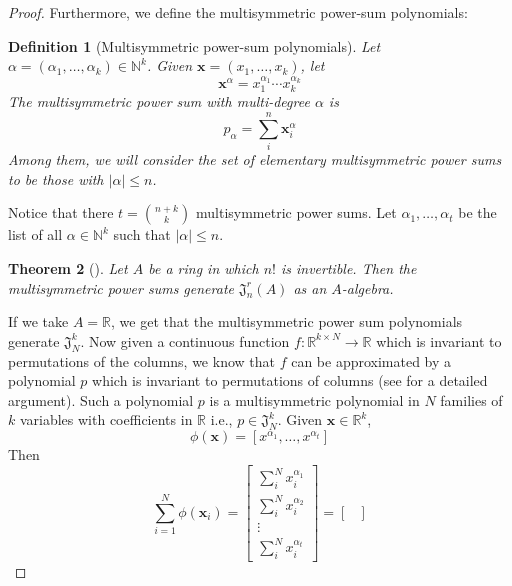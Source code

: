 \documentclass[12pt]{article}
\newcommand{\R}{\mathbb R}
\newcommand{\N}{\mathbb N}
\newtheorem{theorem}{Theorem}[section]
\newtheorem{definition}[theorem]{Definition}
\begin{document}
\begin{proof}
    Furthermore, we define the multisymmetric power-sum polynomials:
    \begin{definition}[Multisymmetric power-sum polynomials]
        Let $\alpha = (\alpha_1, \dots, \alpha_k) \in \N^k$. Given $\mathbf{x} = (x_1, \dots, x_k)$, let
        \begin{equation*}
            \mathbf{x}^{\alpha} = x_1^{\alpha_1} \cdots x_k^{\alpha_k}
        \end{equation*}
        The multisymmetric power sum with multi-degree $\alpha$ is 
        \begin{equation*}
            p_{\alpha} = \sum_i^n \mathbf{x}_i^{\alpha}
        \end{equation*}
        Among them, we will consider the set of elementary multisymmetric power sums to be those with $|\alpha| \leq n$. 
    \end{definition}
    Notice that there $t = \binom{n + k}{k}$ multisymmetric power sums. Let $\alpha_1, \dots, \alpha_t$ be the list of all $\alpha \in \N^k$ such that $|\alpha| \leq n$. 
    \begin{theorem}[\citep{briand2004algebra}]
    \label{thm:multisymmetric-power-sums}
        Let $A$ be a ring in which $n!$ is invertible. Then the multisymmetric power sums generate $\mathfrak{J}_n^r(A)$ as an $A$-algebra. 
    \end{theorem}
    If we take $A = \R$, we get that the multisymmetric power sum polynomials generate $\mathfrak{J}_N^k$. 
    Now given a continuous function $f: \R^{k \times N} \to \R$ which is invariant to permutations of the columns, we know that $f$ can be approximated by a polynomial $p$ which is invariant to permutations of columns (see \citep{maron2019universality} for a detailed argument). Such a polynomial $p$ is a multisymmetric polynomial in $N$ families of $k$ variables with coefficients in $\R$ i.e., $p \in \mathfrak{J}_N^k$. Given $\mathbf{x} \in \R^k$,
    \begin{equation*}
        \phi(\mathbf{x}) = [x^{\alpha_1}, \dots, x^{\alpha_t}]
    \end{equation*}
    Then 
    \begin{equation*}
        \sum_{i = 1}^N \phi(\mathbf{x}_i) = \begin{bmatrix}
            \sum_i^N x_i^{\alpha_1}\\
            \sum_i^N x_i^{\alpha_2} \\
            \vdots \\
            \sum_i^N x_i^{\alpha_t}
        \end{bmatrix} = \begin{bmatrix}

\end{bmatrix}
\end{equation*}
\end{proof}
\end{document}
